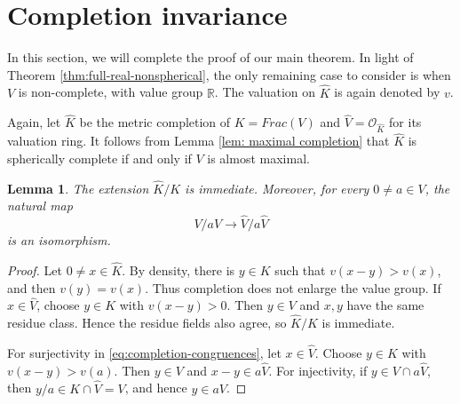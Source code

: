 \documentclass[12pt]{amsart}
\newtheorem{lemma}[theorem]{Lemma}
\theoremstyle{plain}
\newcommand{\wdim}{\operatorname{w.dim}}
\begin{document}

\section{Completion invariance}\label{sec:completion}

\noindent In this section, we will complete the proof of our main theorem. In light of Theorem \ref{thm:full-real-nonspherical}, the only remaining case to consider is when $V$ is non-complete, with value group $\mathbb{R}$. The valuation on $\widehat K$ is again denoted by $v$.

Again, let $\widehat K$ be the metric completion of $K=Frac(V)$ and
$\widehat V=\mathcal O_{\widehat K}$ for its valuation ring. It follows from Lemma \ref{lem: maximal completion} that $\widehat{K}$ is spherically complete if and only if $V$ is almost maximal.

\begin{lemma}\label{lem:completion-congruences}
The extension $\widehat K/K$ is immediate.  Moreover, for every
$0\neq a\in V$, the natural map
\begin{equation}\label{eq:completion-congruences}
  V/aV\longrightarrow\widehat V/a\widehat V
\end{equation}
is an isomorphism.
\end{lemma}

\begin{proof}
Let $0\neq x\in\widehat K$.  By density, there is $y\in K$ such that
$v(x-y)>v(x)$, and then $v(y)=v(x)$.  Thus completion does not enlarge
the value group.  If $x\in\widehat V$, choose $y\in K$ with
$v(x-y)>0$.  Then $y\in V$ and $x,y$ have the same residue class.
Hence the residue fields also agree, so $\widehat K/K$ is immediate.

For surjectivity in \eqref{eq:completion-congruences}, let
$x\in\widehat V$.  Choose $y\in K$ with $v(x-y)>v(a)$.  Then $y\in V$
and $x-y\in a\widehat V$.  For injectivity, if
$y\in V\cap a\widehat V$, then $y/a\in K\cap\widehat V=V$, and hence
$y\in aV$.
\end{proof}
\end{document}
